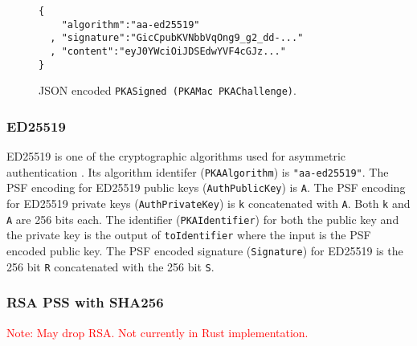 \documentclass{article}
\newcommand{\todo}[1]{\textcolor{red}{#1}}
\begin{document}
\begin{figure}
\begin{lstlisting}
{
    "algorithm":"aa-ed25519"
  , "signature":"GicCpubKVNbbVqOng9_g2_dd-..."
  , "content":"eyJ0YWciOiJDSEdwYVF4cGJz..."
}
\end{lstlisting}
\caption{JSON encoded \texttt{PKASigned (PKAMac PKAChallenge)}.}
\label{code:pkasignedmacchallenge}
\end{figure}

\subsubsection{ED25519}


ED25519 is one of the cryptographic algorithms used for asymmetric authentication \cite{rfc8032}. 
Its algorithm identifer (\texttt{PKAAlgorithm}) is \texttt{"aa-ed25519"}. 
The PSF encoding for ED25519 public keys (\texttt{AuthPublicKey}) is \texttt{A}. 
The PSF encoding for ED25519 private keys (\texttt{AuthPrivateKey}) is \texttt{k} concatenated with \texttt{A}. 
Both \texttt{k} and \texttt{A} are 256 bits each. 
The identifier (\texttt{PKAIdentifier}) for both the public key and the private key is the output of \texttt{toIdentifier} where the input is the PSF encoded public key. 
The PSF encoded signature (\texttt{Signature}) for ED25519 is the 256 bit \texttt{R} concatenated with the 256 bit \texttt{S}.









\subsubsection{RSA PSS with SHA256}
\label{sec:rsapss}

\todo{Note: May drop RSA. Not currently in Rust implementation.}
\end{document}
